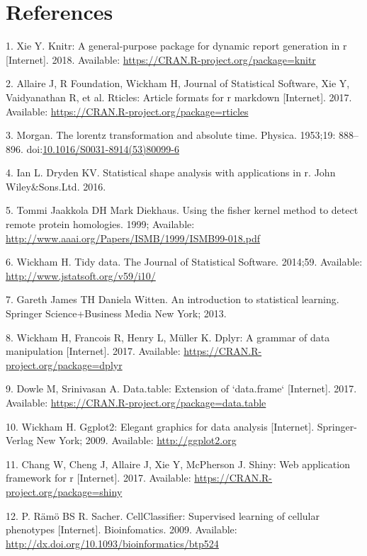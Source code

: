 \documentclass[10pt,letterpaper]{article}
\begin{document}
\newpage

\section*{References}\label{references}


\noindent

\setlength{\parindent}{-0.20in} \setlength{\leftskip}{0.20in}
\setlength{\parskip}{8pt}

\hypertarget{refs}{}
\hypertarget{ref-pkgknitr}{}
1. Xie Y. Knitr: A general-purpose package for dynamic report generation
in r {[}Internet{]}. 2018. Available:
\url{https://CRAN.R-project.org/package=knitr}

\hypertarget{ref-pkgrticles}{}
2. Allaire J, R Foundation, Wickham H, Journal of Statistical Software,
Xie Y, Vaidyanathan R, et al. Rticles: Article formats for r markdown
{[}Internet{]}. 2017. Available:
\url{https://CRAN.R-project.org/package=rticles}

\hypertarget{ref-Sch2017}{}
3. Morgan. The lorentz transformation and absolute time. Physica.
1953;19: 888--896.
doi:\href{https://doi.org/10.1016/S0031-8914(53)80099-6}{10.1016/S0031-8914(53)80099-6}

\hypertarget{ref-Dryden2016}{}
4. Ian L. Dryden KV. Statistical shape analysis with applications in r.
John Wiley\&Sons.Ltd. 2016.

\hypertarget{ref-Jaakkola1999}{}
5. Tommi Jaakkola DH Mark Diekhaus. Using the fisher kernel method to
detect remote protein homologies. 1999; Available:
\url{http://www.aaai.org/Papers/ISMB/1999/ISMB99-018.pdf}

\hypertarget{ref-pkgtidyr}{}
6. Wickham H. Tidy data. The Journal of Statistical Software. 2014;59.
Available: \url{http://www.jstatsoft.org/v59/i10/}

\hypertarget{ref-James2013}{}
7. Gareth James TH Daniela Witten. An introduction to statistical
learning. Springer Science+Business Media New York; 2013.

\hypertarget{ref-pkgdplyr}{}
8. Wickham H, Francois R, Henry L, Müller K. Dplyr: A grammar of data
manipulation {[}Internet{]}. 2017. Available:
\url{https://CRAN.R-project.org/package=dplyr}

\hypertarget{ref-pkgdatatable}{}
9. Dowle M, Srinivasan A. Data.table: Extension of `data.frame`
{[}Internet{]}. 2017. Available:
\url{https://CRAN.R-project.org/package=data.table}

\hypertarget{ref-pkgggplot2}{}
10. Wickham H. Ggplot2: Elegant graphics for data analysis
{[}Internet{]}. Springer-Verlag New York; 2009. Available:
\url{http://ggplot2.org}

\hypertarget{ref-pkgshiny}{}
11. Chang W, Cheng J, Allaire J, Xie Y, McPherson J. Shiny: Web
application framework for r {[}Internet{]}. 2017. Available:
\url{https://CRAN.R-project.org/package=shiny}

\hypertarget{ref-Pelkmanslab}{}
12. P. Rämö BS R. Sacher. CellClassifier: Supervised learning of
cellular phenotypes {[}Internet{]}. Bioinfomatics. 2009. Available:
\url{http://dx.doi.org/10.1093/bioinformatics/btp524}

\nolinenumbers
\end{document}
